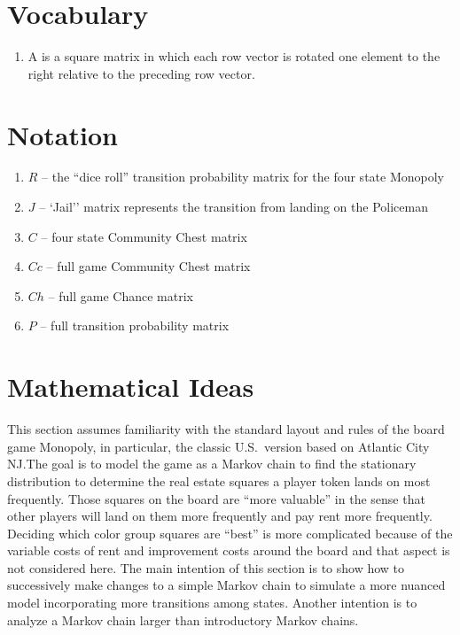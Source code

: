 \documentclass[12pt]{article}
\begin{document}
\hr

\section*{Vocabulary}
\begin{enumerate}
    \item
        A  is a square matrix in which each row
        vector is rotated one element to the right relative to the
        preceding row vector.
\end{enumerate}

\hr

\section*{Notation}
\begin{enumerate}
    \item
        \( R \) -- the ``dice roll'' transition probability matrix for
        the four state Monopoly
    \item
        \( J \) -- `Jail'' matrix represents the transition from landing
        on the Policeman
    \item
        \( C \) -- four state Community Chest matrix
    \item
        \( Cc \) -- full game Community Chest matrix
    \item
        \( Ch \) -- full game Chance matrix
    \item
        \( P \) -- full transition probability matrix
\end{enumerate}

\section*{Mathematical Ideas}

This section assumes familiarity with the standard layout and rules of
the board game Monopoly, in particular, the classic U.S.\ version based
on Atlantic City NJ.\@ The goal is to model the game as a Markov chain
to find the stationary distribution to determine the real estate squares
a player token lands on most frequently.  Those squares on the board are
``more valuable'' in the sense that other players will land on them more
frequently and pay rent more frequently.  Deciding which color group
squares are ``best'' is more complicated because of the variable costs
of rent and improvement costs around the board and that aspect is not
considered here.  The main intention of this section is to show how to
successively make changes to a simple Markov chain to simulate a more
nuanced model incorporating more transitions among states.  Another
intention is to analyze a Markov chain larger than introductory Markov
chains.
\end{document}
